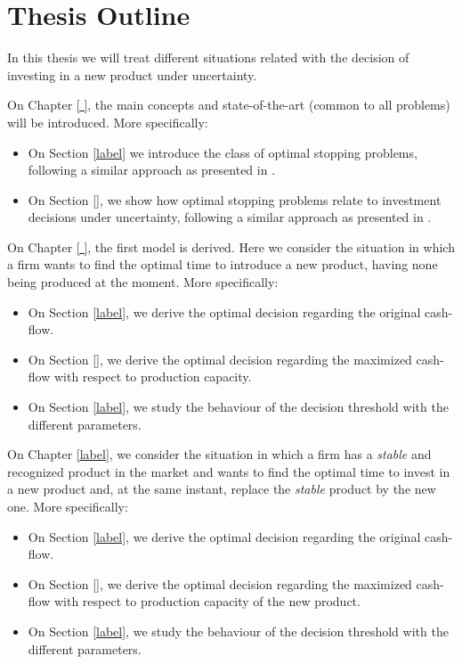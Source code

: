 \section{Thesis Outline}
\label{section:outline}

In this thesis we will treat different situations related with the decision of investing in a new product under uncertainty.

On Chapter \ref{ }, the main concepts and state-of-the-art (common to all problems) will be introduced. More specifically:
\begin{itemize}
	\item On Section \ref{label} we introduce the class of optimal stopping problems, following a similar approach as presented in \cite{ross}.
	
	\item On Section \ref{}, we show how optimal stopping problems relate to investment decisions under uncertainty,  following a similar approach as presented in \cite{dixit:book}.
\end{itemize}

On Chapter \ref{ }, the first model is derived. Here we consider the situation in which a firm wants to find the optimal time to introduce a new product, having none being produced at the moment. More specifically:
\begin{itemize}
	\item On Section \ref{label}, we derive the optimal decision regarding the original cash-flow.
	
	\item On Section \ref{}, we derive the optimal decision regarding the maximized cash-flow with respect to production capacity.
	
	\item On Section \ref{label}, we study the behaviour of the decision threshold with the different parameters.
\end{itemize}

On Chapter \ref{label}, we consider the situation in which a firm has a \textit{stable} and recognized product in the market and wants to find the optimal time to invest in a new product and, at the same instant, replace the \textit{stable} product by the new one.  More specifically:
\begin{itemize}
	\item On Section \ref{label}, we derive the optimal decision regarding the original cash-flow.
	
	\item On Section \ref{}, we derive the optimal decision regarding the maximized cash-flow with respect to production capacity of the new product.
	
	\item On Section \ref{label}, we study the behaviour of the decision threshold with the different parameters.
\end{itemize}

